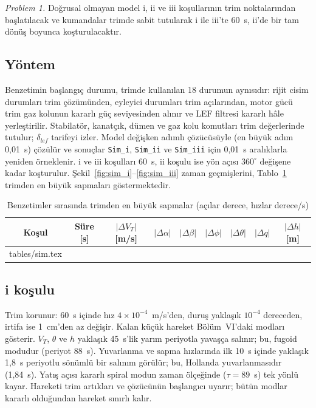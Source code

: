 \documentclass[conf]{new-aiaa}
\makeatletter
\newcommand\tabinput[1]{\@@input #1 }
\makeatother
\begin{document}
\emph{Problem 1.} Doğrusal olmayan model i, ii ve iii koşullarının trim noktalarından başlatılacak ve kumandalar trimde sabit tutularak i ile iii'te 60~s, ii'de bir tam dönüş boyunca koşturulacaktır.

\subsection{Yöntem}
Benzetimin başlangıç durumu, trimde kullanılan 18 durumun aynısıdır: rijit cisim durumları trim çözümünden, eyleyici durumları trim açılarından, motor gücü trim gaz kolunun kararlı güç seviyesinden alınır ve LEF filtresi kararlı hâle yerleştirilir. Stabilatör, kanatçık, dümen ve gaz kolu komutları trim değerlerinde tutulur; $\delta_{lef}$ tarifeyi izler. Model değişken adımlı çözücüsüyle (en büyük adım 0,01~s) çözülür ve sonuçlar \texttt{Sim\_i}, \texttt{Sim\_ii} ve \texttt{Sim\_iii} için 0,01~s aralıklarla yeniden örneklenir. i ve iii koşulları 60~s, ii koşulu ise yön açısı $360^\circ$ değişene kadar koşturulur. Şekil~\ref{fig:sim_i}--\ref{fig:sim_iii} zaman geçmişlerini, Tablo~\ref{tab:sim} trimden en büyük sapmaları göstermektedir.

\begin{table}[hbt!]
\caption{\label{tab:sim} Benzetimler sırasında trimden en büyük sapmalar (açılar derece, hızlar derece/s)}
\centering
\begin{tabular}{ccccccccc}
\toprule
Koşul & Süre [s] & $|\Delta V_T|$ [m/s] & $|\Delta\alpha|$ & $|\Delta\beta|$ & $|\Delta\phi|$ & $|\Delta\theta|$ & $|\Delta q|$ & $|\Delta h|$ [m] \\
\midrule
\tabinput{tables/sim.tex}
\bottomrule
\end{tabular}
\end{table}

\subsection{i koşulu}
Trim korunur: 60~s içinde hız $4\times10^{-4}$~m/s'den, duruş yaklaşık $10^{-4}$ dereceden, irtifa ise 1~cm'den az değişir. Kalan küçük hareket Bölüm~VI'daki modları gösterir. $V_T$, $\theta$ ve $h$ yaklaşık 45~s'lik yarım periyotla yavaşça salınır; bu, fugoid modudur (periyot 88~s). Yuvarlanma ve sapma hızlarında ilk 10~s içinde yaklaşık 1,8~s periyotlu sönümlü bir salınım görülür; bu, Hollanda yuvarlanmasıdır (1,84~s). Yatış açısı kararlı spiral modun zaman ölçeğinde ($\tau=89$~s) tek yönlü kayar. Hareketi trim artıkları ve çözücünün başlangıcı uyarır; bütün modlar kararlı olduğundan hareket sınırlı kalır.
\end{document}
